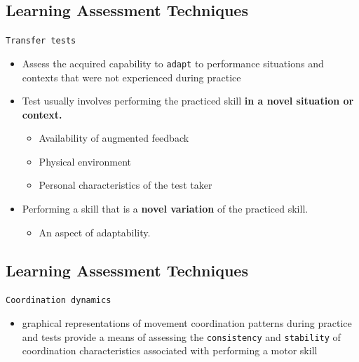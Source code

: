 \documentclass[
  letterpaper,
  DIV=11,
  numbers=noendperiod]{scrartcl}
\providecommand{\tightlist}{%
  \setlength{\itemsep}{0pt}\setlength{\parskip}{0pt}}\usepackage{longtable,booktabs,array}
\begin{document}
\hypertarget{learning-assessment-techniques-3}{%
\subsection{Learning Assessment
Techniques}\label{learning-assessment-techniques-3}}

\texttt{Transfer\ tests}

\begin{itemize}
\tightlist
\item
  Assess the acquired capability to \texttt{adapt} to performance
  situations and contexts that were not experienced during practice
\item
  Test usually involves performing the practiced skill \textbf{in a
  novel situation or context.}\hspace{0pt}

  \begin{itemize}
  \tightlist
  \item
    Availability of augmented feedback
  \item
    Physical environment
  \item
    Personal characteristics of the test taker
  \end{itemize}
\item
  Performing a skill that is a \textbf{novel variation} of the practiced
  skill.\hspace{0pt}

  \begin{itemize}
  \tightlist
  \item
    An aspect of adaptability.
  \end{itemize}
\end{itemize}

\hypertarget{learning-assessment-techniques-4}{%
\subsection{Learning Assessment
Techniques}\label{learning-assessment-techniques-4}}

\texttt{Coordination\ dynamics}

\begin{itemize}
\tightlist
\item
  graphical representations of movement coordination patterns during
  practice and tests provide a means of assessing the
  \texttt{consistency} and \texttt{stability} of coordination
  characteristics associated with performing a motor skill\hspace{0pt}
\end{itemize}
\end{document}

